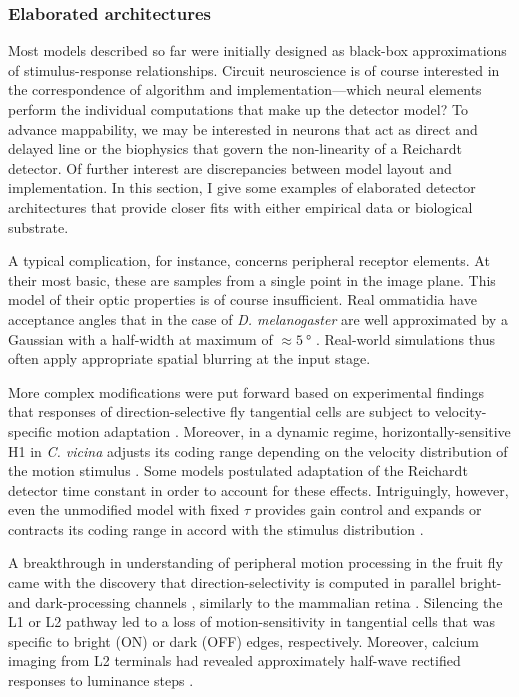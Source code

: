 \subsubsection{Elaborated architectures}
Most models described so far were initially designed as black-box approximations of stimulus-response relationships. Circuit neuroscience is of course interested in the correspondence of algorithm and implementation---which neural elements perform the individual computations that make up the detector model? To advance mappability, we may be interested in neurons that act as direct and delayed line or the biophysics that govern the non-linearity of a Reichardt detector. Of further interest are discrepancies between model layout and implementation. In this section, I give some examples of elaborated detector architectures that provide closer fits with either empirical data or biological substrate.

A typical complication, for instance, concerns peripheral receptor elements. At their most basic, these are samples from a single point in the image plane. This model of their optic properties is of course insufficient. Real ommatidia have acceptance angles that in the case of \textit{D. melanogaster} are well approximated by a Gaussian with a half-width at maximum of $\approx \SI{5}{\degree}$ \citep{Goetz:1965aa}. Real-world simulations thus often apply appropriate spatial blurring at the input stage.

More complex modifications were put forward based on experimental findings that responses of direction-selective fly tangential cells are subject to velocity-specific motion adaptation \citep{Harris:1999kj}. Moreover, in a dynamic regime, horizontally-sensitive H1 in \textit{C. vicina} adjusts its coding range depending on the velocity distribution of the motion stimulus \citep{Brenner:2000aa,Fairhall:2001aa}. Some models postulated adaptation of the Reichardt detector time constant in order to account for these effects. Intriguingly, however, even the unmodified model with fixed $\tau$ provides gain control and expands or contracts its coding range in accord with the stimulus distribution \citep{Borst:2005dr}.

A breakthrough in understanding of peripheral motion processing in the fruit fly came with the discovery that direction-selectivity is computed in parallel bright- and dark-processing channels \citep{Joesch:2010fw}, similarly to the mammalian retina \citep{Borst:2015ko}. Silencing the L1 or L2 pathway led to a loss of motion-sensitivity in tangential cells that was specific to bright (ON) or dark (OFF) edges, respectively. Moreover, calcium imaging from L2 terminals had revealed approximately half-wave rectified responses to luminance steps \citep{Reiff:2010eo}.

